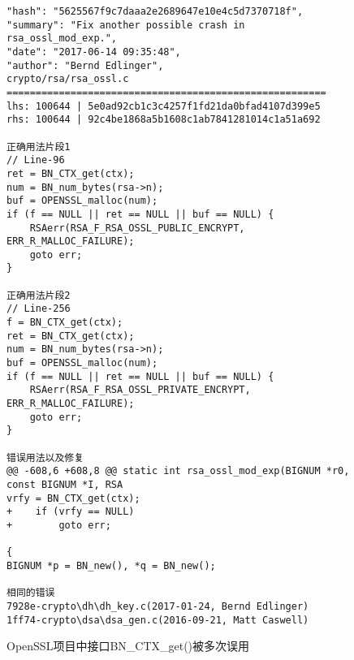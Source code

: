 \begin{figure}[b]
	\centering
\begin{lstlisting}
"hash": "5625567f9c7daaa2e2689647e10e4c5d7370718f",
"summary": "Fix another possible crash in rsa_ossl_mod_exp.",
"date": "2017-06-14 09:35:48",
"author": "Bernd Edlinger",
crypto/rsa/rsa_ossl.c
=======================================================
lhs: 100644 | 5e0ad92cb1c3c4257f1fd21da0bfad4107d399e5
rhs: 100644 | 92c4be1868a5b1608c1ab7841281014c1a51a692

正确用法片段1
// Line-96
ret = BN_CTX_get(ctx);
num = BN_num_bytes(rsa->n);
buf = OPENSSL_malloc(num);
if (f == NULL || ret == NULL || buf == NULL) {
	RSAerr(RSA_F_RSA_OSSL_PUBLIC_ENCRYPT, ERR_R_MALLOC_FAILURE);
	goto err;
}

正确用法片段2
// Line-256
f = BN_CTX_get(ctx);
ret = BN_CTX_get(ctx);
num = BN_num_bytes(rsa->n);
buf = OPENSSL_malloc(num);
if (f == NULL || ret == NULL || buf == NULL) {
	RSAerr(RSA_F_RSA_OSSL_PRIVATE_ENCRYPT, ERR_R_MALLOC_FAILURE);
	goto err;
}

错误用法以及修复
@@ -608,6 +608,8 @@ static int rsa_ossl_mod_exp(BIGNUM *r0, const BIGNUM *I, RSA 
vrfy = BN_CTX_get(ctx);
+    if (vrfy == NULL)
+        goto err;

{
BIGNUM *p = BN_new(), *q = BN_new();

相同的错误
7928e-crypto\dh\dh_key.c(2017-01-24, Bernd Edlinger)
1ff74-crypto\dsa\dsa_gen.c(2016-09-21, Matt Caswell)
\end{lstlisting}
	\caption{
	OpenSSL项目中接口BN\_CTX\_get()被多次误用
	}
	\label{fig:2-3-dul}
\end{figure}